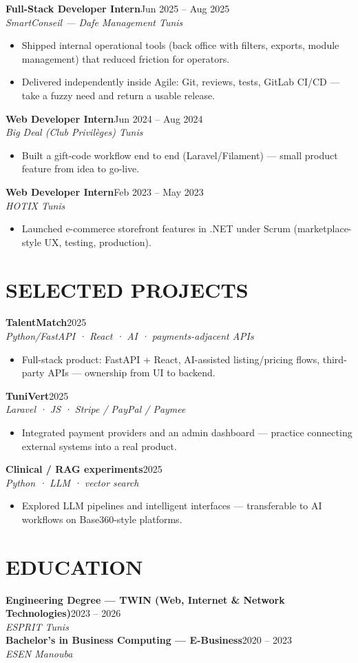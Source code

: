 \documentclass[10pt,a4paper]{article}
\newcommand{\job}[3]{%
  \textbf{\color{primary}#1}\hfill{\color{muted}\small #2}\\[-1pt]
  {\color{accent}\textit{#3}}\\[2pt]
  \begin{itemize}[leftmargin=0.85em, itemsep=1pt, topsep=0pt, parsep=0pt, partopsep=0pt]
}
\newcommand{\proj}[3]{%
  \textbf{\color{primary}#1}\hfill{\color{muted}\small #2}\\[-1pt]
  {\color{accent}\textit{#3}}\\[1pt]
  \begin{itemize}[leftmargin=0.85em, itemsep=1pt, topsep=0pt, parsep=0pt, partopsep=0pt]
}
\newcommand{\edu}[3]{%
  \textbf{\color{primary}#1}\hfill{\color{muted}\small #2}\\[-1pt]
  {\color{accent}\textit{#3}}\\[3pt]
}
\begin{document}
\job{Full-Stack Developer Intern}{Jun 2025 -- Aug 2025}{SmartConseil --- Dafe Management \textbar{} Tunis}
  \item Shipped internal operational tools (back office with filters, exports, module management) that reduced friction for operators.
  \item Delivered independently inside Agile: Git, reviews, tests, GitLab CI/CD --- take a fuzzy need and return a usable release.
\end{itemize}

\job{Web Developer Intern}{Jun 2024 -- Aug 2024}{Big Deal (Club Privilèges) \textbar{} Tunis}
  \item Built a gift-code workflow end to end (Laravel/Filament) --- small product feature from idea to go-live.
\end{itemize}

\job{Web Developer Intern}{Feb 2023 -- May 2023}{HOTIX \textbar{} Tunis}
  \item Launched e-commerce storefront features in .NET under Scrum (marketplace-style UX, testing, production).
\end{itemize}

\section{SELECTED PROJECTS}
{\footnotesize
\setlength{\parskip}{1pt}
\proj{TalentMatch}{2025}{Python/FastAPI · React · AI · payments-adjacent APIs}
  \item Full-stack product: FastAPI + React, AI-assisted listing/pricing flows, third-party APIs --- ownership from UI to backend.
\end{itemize}
\proj{TuniVert}{2025}{Laravel · JS · Stripe / PayPal / Paymee}
  \item Integrated payment providers and an admin dashboard --- practice connecting external systems into a real product.
\end{itemize}
\proj{Clinical / RAG experiments}{2025}{Python · LLM · vector search}
  \item Explored LLM pipelines and intelligent interfaces --- transferable to AI workflows on Base360-style platforms.
\end{itemize}
}

\section{EDUCATION}
\edu{Engineering Degree --- TWIN (Web, Internet \& Network Technologies)}{2023 -- 2026}{ESPRIT \textbar{} Tunis}
\edu{Bachelor's in Business Computing --- E-Business}{2020 -- 2023}{ESEN \textbar{} Manouba}
\end{document}
